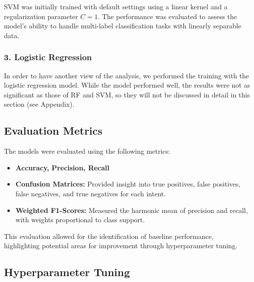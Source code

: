         
            SVM was initially trained with default settings using a linear kernel and a regularization parameter \( C = 1 \). The performance was evaluated to assess the model's ability to handle multi-label classification tasks with linearly separable data.

        \subsubsection*{3. Logistic Regression \\}
        
        
            In order to have another view of the analysis, we performed the training with the logistic regression model. While the model performed well, the results were not as significant as those of RF and SVM, so they will not be discussed in detail in this section (see Appendix).

    \subsection{Evaluation Metrics}
    
        The models were evaluated using the following metrics:
        
        \begin{itemize}
        
            \item \textbf{Accuracy, Precision, Recall}
            
            \item \textbf{Confusion Matrices:} Provided insight into true positives, false positives, false negatives, and true negatives for each intent.
            
            \item \textbf{Weighted F1-Scores:} Measured the harmonic mean of precision and recall, with weights proportional to class support.
        
        \end{itemize}

        This evaluation allowed for the identification of baseline performance, highlighting potential areas for improvement through hyperparameter tuning.

    \subsection{Hyperparameter Tuning}
    
